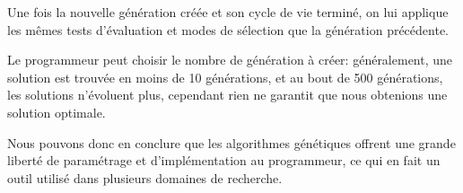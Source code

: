 	Une fois la nouvelle génération créée et son cycle de vie terminé, on lui applique les mêmes tests d'évaluation et modes de sélection que la génération précédente.

Le programmeur peut choisir le nombre de génération à créer: généralement, une solution est trouvée en moins de 10 générations, et au bout de 500 générations, les solutions n'évoluent plus, cependant rien ne garantit que nous obtenions une solution optimale.

Nous pouvons donc en conclure que les algorithmes génétiques offrent une grande liberté de paramétrage et d'implémentation au programmeur, ce qui en fait un outil utilisé dans plusieurs domaines de recherche.

